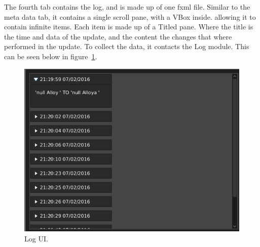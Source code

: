 The fourth tab contains the log, and is made up of one fxml file. Similar to the meta data tab, it contains a single scroll pane, with a VBox inside. allowing it to contain infinite items. Each item is made up of a Titled pane. Where the title is the time and data of the update, and the content the changes that where performed in the update. To collect the data, it contacts the Log module. This can be seen below in figure~\ref{fig:imp_ui_log}.

\begin{figure}[H]
	\centering
	\includegraphics[scale=0.32]{images/ui_log_final.png}
	\caption{Log UI.}
	\label{fig:imp_ui_log}
\end{figure}
